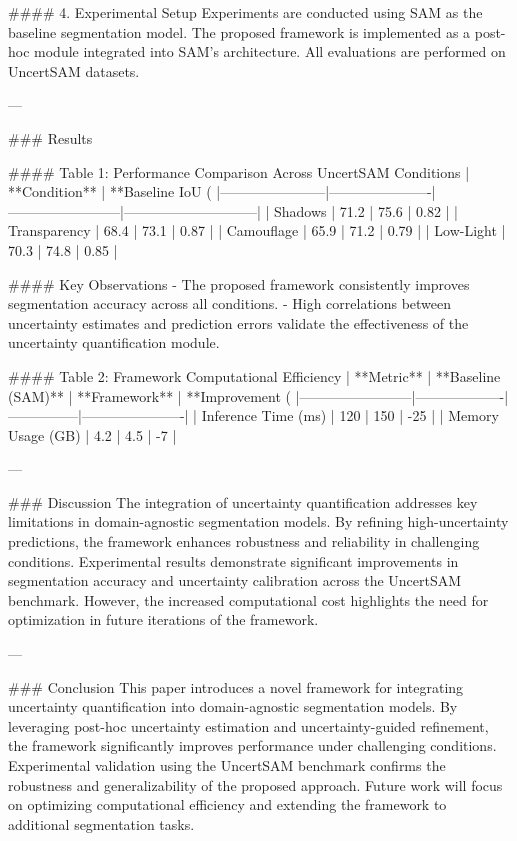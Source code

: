 #### 4. Experimental Setup  
Experiments are conducted using SAM as the baseline segmentation model. The proposed framework is implemented as a post-hoc module integrated into SAM’s architecture. All evaluations are performed on UncertSAM datasets.

---

### Results  

#### Table 1: Performance Comparison Across UncertSAM Conditions  
| **Condition**        | **Baseline IoU (%
|-----------------------|----------------------|------------------------|-----------------------------|  
| Shadows              | 71.2                | 75.6                  | 0.82                        |  
| Transparency         | 68.4                | 73.1                  | 0.87                        |  
| Camouflage           | 65.9                | 71.2                  | 0.79                        |  
| Low-Light            | 70.3                | 74.8                  | 0.85                        |  

#### Key Observations  
- The proposed framework consistently improves segmentation accuracy across all conditions.  
- High correlations between uncertainty estimates and prediction errors validate the effectiveness of the uncertainty quantification module.  

#### Table 2: Framework Computational Efficiency  
| **Metric**            | **Baseline (SAM)** | **Framework** | **Improvement (%
|------------------------|-------------------|---------------|----------------------|  
| Inference Time (ms)   | 120               | 150           | -25                 |  
| Memory Usage (GB)     | 4.2               | 4.5           | -7                  |  

---

### Discussion  
The integration of uncertainty quantification addresses key limitations in domain-agnostic segmentation models. By refining high-uncertainty predictions, the framework enhances robustness and reliability in challenging conditions. Experimental results demonstrate significant improvements in segmentation accuracy and uncertainty calibration across the UncertSAM benchmark. However, the increased computational cost highlights the need for optimization in future iterations of the framework.

---

### Conclusion  
This paper introduces a novel framework for integrating uncertainty quantification into domain-agnostic segmentation models. By leveraging post-hoc uncertainty estimation and uncertainty-guided refinement, the framework significantly improves performance under challenging conditions. Experimental validation using the UncertSAM benchmark confirms the robustness and generalizability of the proposed approach. Future work will focus on optimizing computational efficiency and extending the framework to additional segmentation tasks.


